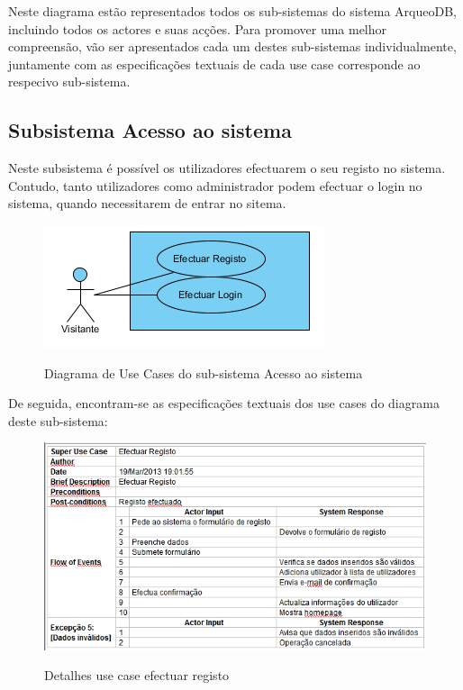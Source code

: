 \documentclass[12pt,a4paper]{article}
\begin{document}
\clearpage

Neste diagrama estão representados todos os sub-sistemas do sistema ArqueoDB, incluindo todos os actores e suas acções. Para promover uma  melhor compreensão, vão ser apresentados cada um destes sub-sistemas individualmente, juntamente com as especificações textuais de cada use case corresponde ao respecivo sub-sistema. \\

\clearpage
\subsection{Subsistema Acesso ao sistema}
Neste subsistema é possível os utilizadores efectuarem o seu registo no sistema. Contudo, tanto utilizadores como administrador podem efectuar o login no sistema, quando necessitarem de entrar no sitema.\\

\begin{figure}[h!]
\centering
\includegraphics[scale=1]{usecase/U_AcessoSistema}
\label{usecase}
\caption{Diagrama de Use Cases do sub-sistema Acesso ao sistema}
\end{figure}

De seguida, encontram-se as especificações textuais dos use cases do diagrama deste sub-sistema:\\

\begin{figure}[h!]
\centering
\includegraphics[scale=0.7]{d_usecase/registo}
\label{usecase}
\caption{Detalhes use case efectuar registo}
\end{figure}
\end{document}
